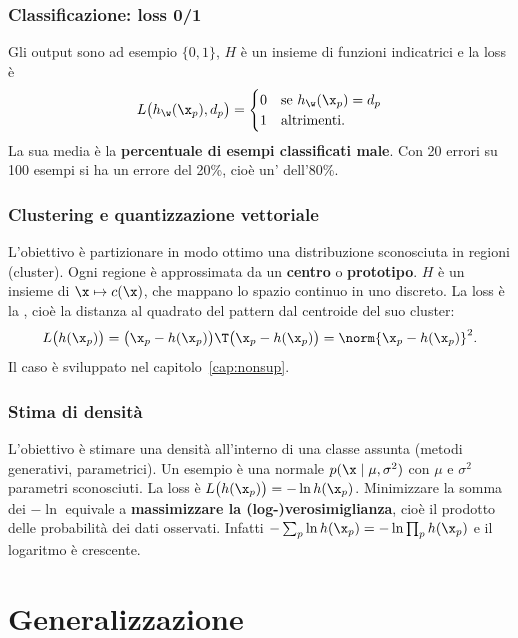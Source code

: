 \subsubsection{Classificazione: loss 0/1}
Gli output sono ad esempio $\{0,1\}$, $H$ è un insieme di funzioni indicatrici e la loss è
\[
L\big(h_\w(\x_p),d_p\big) = \begin{cases} 0 & \text{se } h_\w(\x_p) = d_p\\ 1 & \text{altrimenti.}\end{cases}
\]
La sua media è la \textbf{percentuale di esempi classificati male}. Con 20 errori su 100 esempi si ha un errore
del 20\%, cioè un' dell'80\%.

\subsubsection{Clustering e quantizzazione vettoriale}
L'obiettivo è partizionare in modo ottimo una distribuzione sconosciuta in regioni (cluster). Ogni regione è
approssimata da un \textbf{centro} o \textbf{prototipo}. $H$ è un insieme di 
$\x\mapsto c(\x)$, che mappano lo spazio continuo in uno discreto. La loss è la ,
cioè la distanza al quadrato del pattern dal centroide del suo cluster:
\[
L\big(h(\x_p)\big) = \big(\x_p - h(\x_p)\big)\T\big(\x_p - h(\x_p)\big) = \norm{\x_p - h(\x_p)}^2 .
\]
Il caso è sviluppato nel capitolo~\ref{cap:nonsup}.

\subsubsection{Stima di densità}
L'obiettivo è stimare una densità all'interno di una classe assunta (metodi generativi, parametrici). Un esempio è
una normale $p(\x\mid\mu,\sigma^2)$ con $\mu$ e $\sigma^2$ parametri sconosciuti. La loss è
$L\big(h(\x_p)\big) = -\ln h(\x_p)$. Minimizzare la somma dei $-\ln$ equivale a \textbf{massimizzare la
(log-)verosimiglianza}, cioè il prodotto delle probabilità dei dati osservati. Infatti
$-\sum_p\ln h(\x_p) = -\ln\prod_p h(\x_p)$ e il logaritmo è crescente.

\section{Generalizzazione}
\label{sec:generalizzazione-intro}

